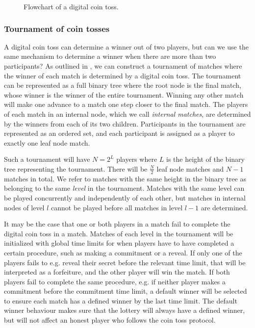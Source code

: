 \begin{figure}[htbp]
  \centering
  
  \caption{Flowchart of a digital coin toss.}
  \label{fig:digital-coin-toss-flow}
\end{figure}

\subsubsection{Tournament of coin tosses}
A digital coin toss can determine a winner out of two players, but can we use the same mechanism to determine a winner when there are more than two participants? As outlined in \cite{bartoletti_constant-deposit_2017,miller_zero-collateral_2017}, we can construct a tournament of matches where the winner of each match is determined by a digital coin toss. The tournament can be represented as a full binary tree where the root node is the final match, whose winner is the winner of the entire tournament. Winning any other match will make one advance to a match one step closer to the final match. The players of each match in an internal node, which we call \emph{internal matches}, are determined by the winners from each of its two children. Participants in the tournament are represented as an ordered set, and each participant is assigned as a player to exactly one leaf node match. 

Such a tournament will have $N=2^L$ players where $L$ is the height of the binary tree representing the tournament. There will be $\frac{N}{2}$ leaf node matches and $N-1$ matches in total. We refer to matches with the same height in the binary tree as belonging to the same \emph{level} in the tournament. Matches with the same level can be played concurrently and independently of each other, but matches in internal nodes of level $l$ cannot be played before all matches in level $l-1$ are determined.

It may be the case that one or both players in a match fail to complete the digital coin toss in a match. Matches of each level in the tournament will be initialized with global time limits for when players have to have completed a certain procedure, such as making a commitment or a reveal. If only one of the players fails to e.g. reveal their secret before the relevant time limit, that will be interpreted as a forfeiture, and the other player will win the match. If both players fail to complete the same procedure, e.g. if neither player makes a commitment before the commitment time limit, a default winner will be selected to ensure each match has a defined winner by the last time limit. The default winner behaviour makes sure that the lottery will always have a defined winner, but will not affect an honest player who follows the coin toss protocol.

